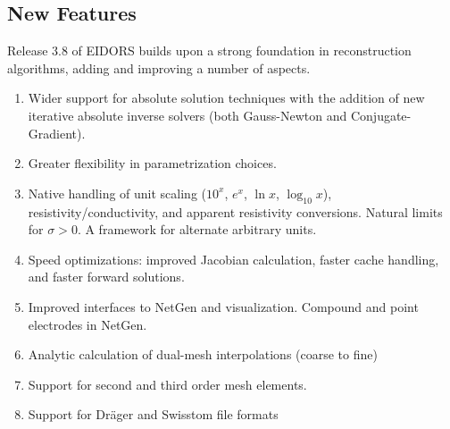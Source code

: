 \documentclass[10pt,a4paper]{article}
\begin{document}
\begin{multicols}{2}
\section{New Features}
Release 3.8 of EIDORS builds upon a strong foundation in reconstruction
algorithms, adding and improving a number of aspects.
\begin{enumerate}
\item Wider support for absolute solution techniques with the addition of new
  iterative absolute inverse solvers (both Gauss-Newton and
  Conjugate-Gradient).

\item Greater flexibility in parametrization choices.

\item Native handling of unit scaling ($10^x$, $e^x$, $\ln x$, $\log_{10} x$), resistivity/conductivity, and apparent resistivity conversions.
  Natural limits for $\sigma > 0$. %
  A framework for alternate arbitrary units.

\item Speed optimizations: improved Jacobian calculation, faster cache handling, and 
  faster forward solutions.


\item Improved interfaces to NetGen and visualization.
      Compound and point electrodes in NetGen.

\item Analytic calculation of dual-mesh interpolations (coarse to fine)

\item Support for second and third order mesh elements.

\item Support for Dr\"ager and Swisstom file formats


\end{enumerate}
\end{multicols}
\end{document}
